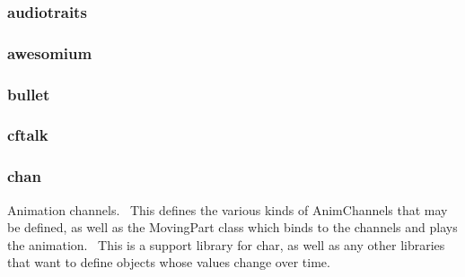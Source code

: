 \documentclass[a4paper]{article}
\begin{document}
\clearpage\subsubsection[audiotraits]{audiotraits}
\hypertarget{RefHeading20991167907073}{}\subsubsection{}
\clearpage\subsubsection[awesomium]{awesomium}
\hypertarget{RefHeading21011167907073}{}\subsubsection{}
\clearpage\subsubsection[bullet]{bullet}
\hypertarget{RefHeading21031167907073}{}
\bigskip

\clearpage\subsubsection[cftalk]{cftalk}
\hypertarget{RefHeading21051167907073}{}\subsubsection{}
\clearpage\subsubsection[chan]{chan}
\hypertarget{RefHeading21071167907073}{}{\color{black}
Animation channels. \ This defines the various kinds of\newline
AnimChannels that may be defined, as well as the MovingPart class\newline
which binds to the channels and plays the animation. \ This is a\newline
support library for char, as well as any other libraries that want\newline
to define objects whose values change over time.}
\end{document}

